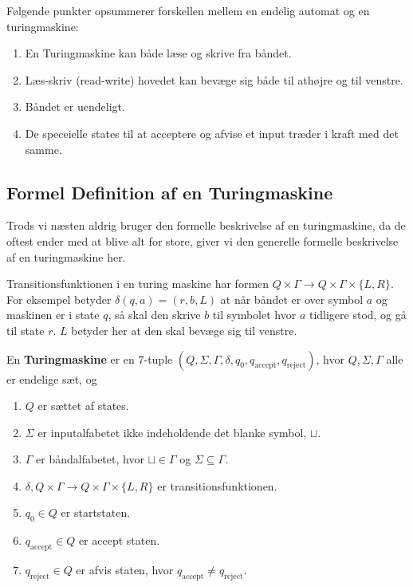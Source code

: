 Følgende punkter opsummerer forskellen mellem en endelig automat og en turingmaskine:

\begin{enumerate}
  \item En Turingmaskine kan både læse og skrive fra båndet.
  \item Læs-skriv (read-write) hovedet kan bevæge sig både til athøjre og til venstre.
  \item Båndet er uendeligt.
  \item De speceielle states til at acceptere og afvise et input træder i kraft med det samme.
\end{enumerate}

\subsection{Formel Definition af en Turingmaskine}%
\label{subsec:formaldefturingmachine}



Trods vi næsten aldrig bruger den formelle beskrivelse af en turingmaskine, da de oftest ender med at blive alt for store, giver vi den generelle formelle beskrivelse af en turingmaskine her.

Transitionsfunktionen i en turing maskine har formen $Q \times \Gamma \longrightarrow Q \times \Gamma \times \{L, R\}$. For eksempel betyder $\delta (q,a) = (r,b,L)$ at når båndet er over symbol $a$ og maskinen er i state $q$, så skal den skrive $b$ til symbolet hvor $a$ tidligere stod, og gå til state $r$. $L$ betyder her at den skal bevæge sig til venstre.

\begin{definition}
  \label{def:formalturing}
  En \textbf{Turingmaskine} er en 7-tuple $(Q, \Sigma, \Gamma, \delta, q_{0}, q_{\text{accept}}, q_{\text{reject}})$, hvor $Q, \Sigma, \Gamma$ alle er endelige sæt, og
  \begin{enumerate}
    \item $Q$ er sættet af states.
    \item $\Sigma$ er inputalfabetet ikke indeholdende det blanke symbol, $\sqcup$.
    \item $\Gamma$ er båndalfabetet, hvor $\sqcup \in \Gamma$ og $\Sigma \subseteq \Gamma$.
    \item $\delta, Q \times \Gamma \longrightarrow Q \times \Gamma \times \{L, R\}$ er transitionsfunktionen.
    \item $q_{0} \in Q$ er startstaten.
    \item $q_{\text{accept}} \in Q$ er accept staten.
    \item $q_{\text{reject}} \in Q$ er afvis staten, hvor $q_{\text{accept}} \neq q_{\text{reject}}$.
  \end{enumerate}
\end{definition}

